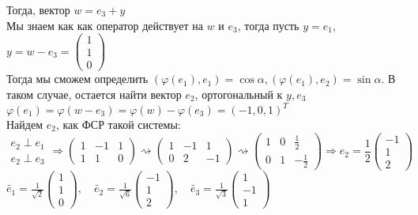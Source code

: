 \documentclass[a4paper]{article}
\begin{document}
\indent Тогда, вектор $w=e_3+y$\\[2mm]
\indent Мы знаем как как оператор действует на $w$ и $e_3$, тогда пусть $y=e_1$, $y=w-e_3=\begin{pmatrix}
    1\\
    1\\
    0
\end{pmatrix}$\\[2mm]
\indent Тогда мы сможем определить $(\varphi(e_1), e_1)=\cos{\alpha}, (\varphi(e_1), e_2)=\sin{\alpha}$. В таком случае, остается найти вектор $e_2$, ортогональный к $y, e_3$\\[2mm]
\indent $\varphi(e_1)=\varphi(w-e_3)=\varphi(w)-\varphi(e_3)=(-1, 0, 1)^T$\\[2mm]
\indent Найдем $e_2$, как ФСР такой системы\footnotemark:
$$\begin{aligned}
    e_2\perp e_1\\
    e_2\perp e_3
\end{aligned}\Longrightarrow\begin{pmatrix}
    1&-1&1\\
    1&1&0
\end{pmatrix}\rightsquigarrow\begin{pmatrix}
    1&-1&1\\
    0&2&-1
\end{pmatrix}\rightsquigarrow\begin{pmatrix}
    1&0&\frac{1}{2}\\
    0&1&-\frac{1}{2}
\end{pmatrix}\Longrightarrow e_2=\frac{1}{2}\begin{pmatrix}
    -1\\
    1\\
    2
\end{pmatrix}$$
\indent $\boxed{\widetilde{e_1}=\displaystyle\frac{1}{\sqrt{2}}\begin{pmatrix}
    1\\
    1\\
    0
\end{pmatrix},\quad \widetilde{e_2}=\frac{1}{\sqrt{6}}\begin{pmatrix}
    -1\\
    1\\
    2
\end{pmatrix},\quad\widetilde{e_3}=\frac{1}{\sqrt{3}}\begin{pmatrix}
    1\\
    -1\\
    1
\end{pmatrix}}$\\[2mm]
\end{document}
